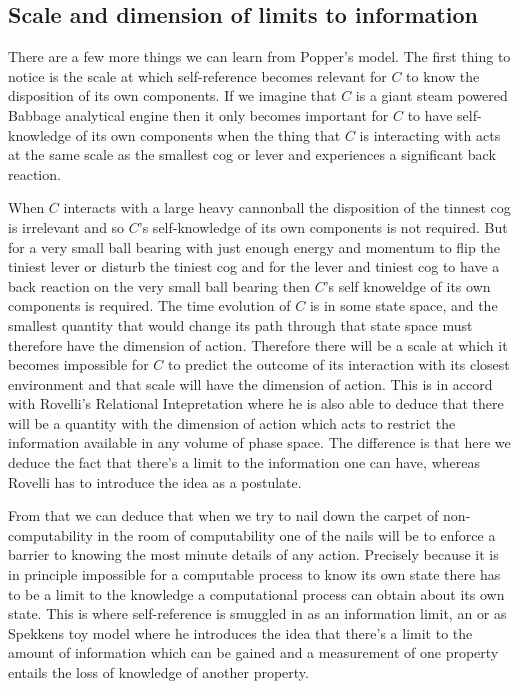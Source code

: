 \subsection{Scale and dimension of limits to information }
There are a few more things we can learn from Popper's model.  The first thing to notice is the scale at which self-reference becomes relevant for $C$ to know the disposition of its own components. If we imagine that $C$ is a giant steam powered Babbage analytical engine then it only becomes important for $C$ to have self-knowledge of its own components when the thing that $C$ is interacting with acts at the same scale as the smallest cog or lever and experiences a significant back reaction. 

When $C$ interacts with a large heavy cannonball the disposition of the tinnest cog is irrelevant and so $C$'s self-knowledge of its own components is not required. But for a very small ball bearing with just enough energy and momentum to flip the tiniest lever or disturb the tiniest cog and for the lever and tiniest cog to have a back reaction on the very small ball bearing then $C$'s self knoweldge of its own components is required. The time evolution of $C$ is in some state space, and the smallest quantity that would change its path through that state space must therefore have the dimension of action. Therefore there will be a scale at which it becomes impossible for $C$ to predict the outcome of its interaction with its closest environment and that scale will have the dimension of action. This is in accord with Rovelli's Relational Intepretation \autocite{Rovelli1996a} where he is also able to deduce that there will be a quantity with the dimension of action which acts to restrict the information available in any volume of phase space. The difference is that here we deduce the fact that there's a limit to the information one can have, whereas Rovelli has to introduce the idea as a postulate. 

From that we can deduce that when we try to nail down the carpet of non-computability in the room of computability one of the nails will be to enforce a barrier to knowing the most minute details of any action. Precisely because it is in principle impossible for a computable process to know its own state there has to be a limit to the knowledge a computational process can obtain about its own state.  This is where self-reference is smuggled in as an information limit, an \autocite{szangolies_j_2018, szangolies_2020} or as Spekkens toy model \autocite{spekkens2007toy} where he introduces the idea that there's a limit to the amount of information which can be gained and a measurement of one property entails the loss of knowledge of another property. 

